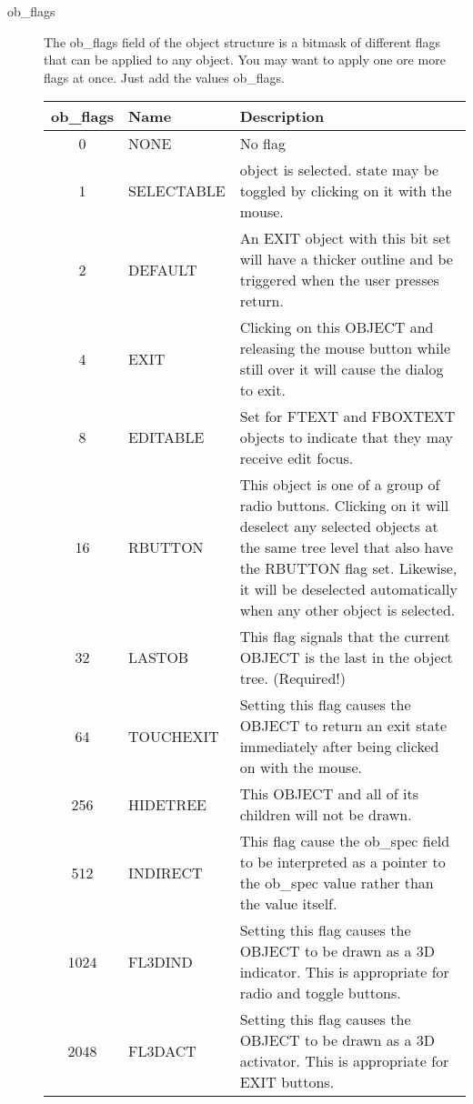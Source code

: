 \begin{description}
\item[ob\_flags] The ob\_flags field of the object structure is a bitmask of
different flags that can be applied to any object. You may want to apply 
one ore more flags at once. Just add the values ob\_flags.

\begin{center}\begin{longtable}{|clp{9cm}|}
\hline
{\bf ob\_flags} & {\bf Name} & {\bf Description}\\
\hline
0 & NONE       & No flag \\\hline
1 & SELECTABLE & object is selected. state may be toggled by clicking on it with the mouse.\\\hline
2 & DEFAULT    & An EXIT object with this bit set will have a thicker outline and be triggered when the 
                 user presses return.\\\hline
4 & EXIT       & Clicking on this OBJECT and releasing the mouse button while still over it 
                 will cause the dialog to exit.\\\hline
8 & EDITABLE   & Set for FTEXT and FBOXTEXT objects to indicate that they may receive edit focus.\\\hline
16 & RBUTTON   & This object is one of a group of radio buttons. Clicking on it will deselect
                 any selected objects at the same tree level that also have the RBUTTON flag
                 set. Likewise, it will be deselected automatically when any other object is selected.\\\hline
32 & LASTOB    & This flag signals that the current OBJECT is the last in the object tree. (Required!)\\\hline
64 & TOUCHEXIT & Setting this flag causes the OBJECT to return an exit state immediately after   
                 being clicked on with the mouse.\\\hline
256 & HIDETREE & This OBJECT and all of its children will not be drawn.\\\hline
512 & INDIRECT & This flag cause the ob\_spec field to be interpreted as a pointer to the      
                 ob\_spec value rather than the value itself.\\\hline
1024 & FL3DIND & Setting this flag causes the OBJECT to be drawn as a 3D indicator. This is  
                 appropriate for radio and toggle buttons.\\\hline
2048 & FL3DACT & Setting this flag causes the OBJECT to be drawn as a 3D activator. This is  
                 appropriate for EXIT buttons.\\\hline

\end{longtable}
\end{center}
\end{description}
